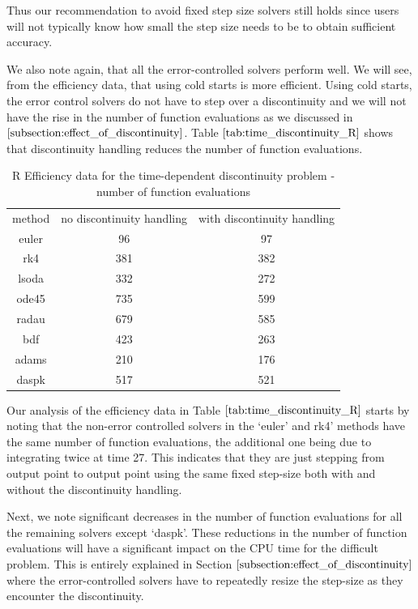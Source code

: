 Thus our recommendation to avoid fixed step size solvers still holds since users will not typically know how small the step size needs to be to obtain sufficient accuracy.

We also note again, that all the error-controlled solvers perform well. We will see, from the efficiency data, that using cold starts is more efficient. Using cold starts, the error control solvers do not have to step over a discontinuity and we will not have the rise in the number of function evaluations as we discussed in $\ref{subsection:effect_of_discontinuity}$. Table $\ref{tab:time_discontinuity_R}$ shows that discontinuity handling reduces the number of function evaluations. 

\begin{table}[H]
\caption {R Efficiency data for the time-dependent discontinuity problem - number of function evaluations} 
\label{tab:time_discontinuity_R}
\begin{center}
\begin{tabular}{ c c c } 
method & no discontinuity handling & with discontinuity handling \\ 
euler & 96 & 97 \\
rk4 & 381 & 382 \\ 
lsoda & 332 & 272 \\
ode45 & 735 & 599 \\
radau & 679 & 585 \\
bdf & 423 & 263 \\
adams & 210 & 176 \\
daspk & 517 & 521
\end{tabular}
\end{center}
\end{table}

Our analysis of the efficiency data in Table $\ref{tab:time_discontinuity_R}$ starts by noting that the non-error controlled solvers in the `euler' and rk4' methods have the same number of function evaluations, the additional one being due to integrating twice at time 27. This indicates that they are just stepping from output point to output point using the same fixed step-size both with and without the discontinuity handling.

Next, we note significant decreases in the number of function evaluations for all the remaining solvers except `daspk'. These reductions in the number of function evaluations will have a significant impact on the CPU time for the difficult problem. This is entirely explained in Section $\ref{subsection:effect_of_discontinuity}$ where the error-controlled solvers have to repeatedly resize the step-size as they encounter the discontinuity.

